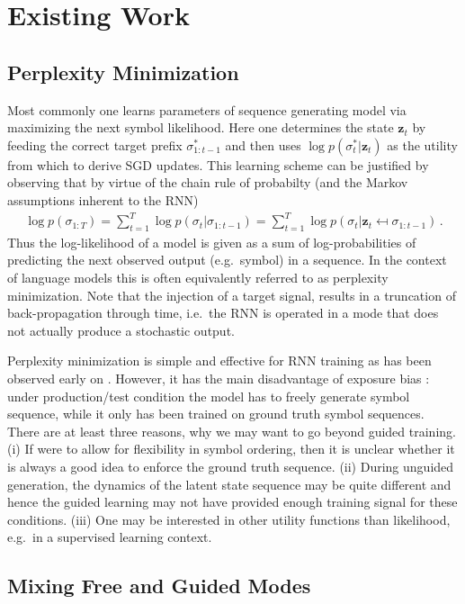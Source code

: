 \documentclass{article}
\newcommand{\up}[1]{_{#1}}
\newcommand{\z}{{\mathbf z}}
\begin{document}
\section{Existing Work} 

\subsection{Perplexity Minimization} 
Most commonly one learns parameters of sequence generating model  via maximizing the next symbol likelihood. Here one determines the state $\z \up t$ by feeding the correct target prefix $\sigma^*_{1:t-1}$ and then uses $\log p(\sigma^* \up t | \z_t )$ as the utility  from which to derive SGD updates. This learning scheme can be justified by observing that by virtue of the chain rule of probabilty (and the Markov assumptions inherent to the RNN)
\begin{align}
\log p(\sigma_{1:T}) = \sum_{t=1}^T \log p(\sigma_t | \sigma_{1:t-1}) = \sum_{t=1}^T \log p(\sigma_t | \z_t \mapsfrom \sigma_{1:t-1})\,.
\end{align}
Thus  the log-likelihood of a model is given as a sum of log-probabilities of predicting the next observed output (e.g.~symbol) in a sequence. In the context of language models this is often equivalently referred to as perplexity minimization. Note that the injection of a target signal, results in a truncation of back-propagation through time, i.e.~the RNN is operated in a mode that does not actually produce a stochastic output.


Perplexity minimization is simple and effective for RNN training as has been observed early on \cite{pineda1988dynamics,williams1989learning}. However, it has the main disadvantage of exposure bias \cite{ranzato2015sequence}:  under production/test condition the model has to freely generate symbol sequence, while it only has been trained on ground truth symbol sequences. 
%
There are at least three reasons, why  we may want to go beyond guided training. (i) If were to allow for flexibility in symbol ordering, then it is unclear whether it is always a good idea to enforce the ground truth sequence. (ii) During unguided generation, the dynamics of the latent state sequence may be quite different and hence the guided learning may not have provided enough training signal for these conditions. (iii) One may be interested in other utility functions than likelihood, e.g.~in a supervised learning context. 

\subsection{Mixing Free and Guided Modes} 
\end{document}
